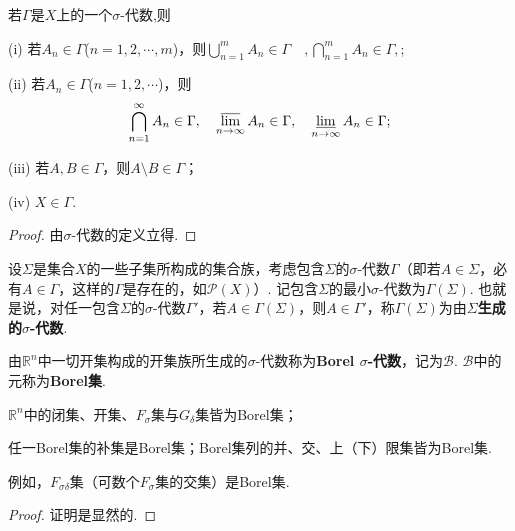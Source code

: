 \documentclass[../../main.tex]{subfiles}
\begin{document}
\begin{proposition}\label{proposition:σ-代数的基本性质}
若$\Gamma$是$X$上的一个$\sigma$-代数,则

(i) 若$A_n\in\Gamma$($n = 1,2,\cdots,m$)，则$\bigcup_{n = 1}^{m}A_n\in\Gamma\quad ,\bigcap_{n = 1}^{m}A_n\in\Gamma, $;

(ii) 若$A_n\in\Gamma$($n = 1,2,\cdots$)，则
\begin{align*}
\bigcap_{n = 1}^{\infty}A_n\in\Gamma, \quad \varlimsup_{n\to\infty}A_n\in\Gamma, \quad \varliminf_{n\to\infty}A_n\in\Gamma;
\end{align*}

(iii) 若$A,B\in\Gamma$，则$A\setminus B\in\Gamma$；

(iv) $X\in\Gamma$. 
\end{proposition}
\begin{proof}
由$\sigma$-代数的定义立得.

\end{proof}

\begin{definition}[生成$\sigma$-代数]
设$\Sigma$是集合$X$的一些子集所构成的集合族，考虑包含$\Sigma$的$\sigma$-代数$\Gamma$（即若$A\in\Sigma$，必有$A\in\Gamma$，这样的$\Gamma$是存在的，如$\mathcal{P}(X)$）. 记包含$\Sigma$的最小$\sigma$-代数为$\Gamma(\Sigma)$. 也就是说，对任一包含$\Sigma$的$\sigma$-代数$\Gamma'$，若$A\in\Gamma(\Sigma)$，则$A\in\Gamma'$，称$\Gamma(\Sigma)$为由\textbf{$\Sigma$生成的$\sigma$-代数}.
\end{definition}

\begin{definition}[Borel集]\label{definition:Borel集}
由$\mathbb{R}^n$中一切开集构成的开集族所生成的$\sigma$-代数称为\textbf{Borel $\sigma$-代数}，记为$\mathscr{B}$. $\mathscr{B}$中的元称为\textbf{Borel集}.
\end{definition}

\begin{proposition}[Borel集的基本性质]\label{proposition:Borel集的基本性质}
$\mathbb{R}^n$中的闭集、开集、$F_{\sigma}$集与$G_{\delta}$集皆为Borel集；

任一Borel集的补集是Borel集；Borel集列的并、交、上（下）限集皆为Borel集. 
\end{proposition}
\begin{note}
例如，$F_{\sigma\delta}$集（可数个$F_{\sigma}$集的交集）是Borel集.
\end{note}
\begin{proof}
证明是显然的.

\end{proof}
\end{document}
